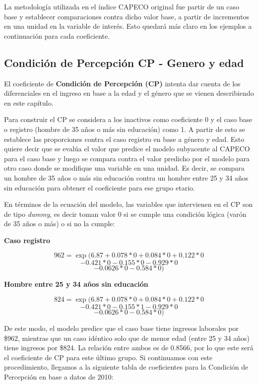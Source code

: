 La metodología utilizada en el índice CAPECO original fue partir de un caso base y establecer comparaciones contra dicho valor base, a partir de incrementos en una unidad en la variable de interés. Esto quedará más claro en los ejemplos a continuación para cada coeficiente.

\subsection{Condición de Percepción CP - Genero y edad}

El coeficiente de \textbf{Condición de Percepción (CP)} intenta dar cuenta de los diferenciales en el ingreso en base a la edad y el género que se vienen describiendo en este capítulo. 

Para construir el CP se considera a los inactivos como coeficiente 0 y el caso base o registro (hombre de 35 años o más sin educación) como 1. A partir de esto se establece las proporciones contra el caso registro en base a género y edad. Esto quiere decir que se evalúa el valor que predice el modelo subyacente al CAPECO para el caso base y luego se compara contra el valor predicho por el modelo para otro caso donde se modifique una variable en una unidad. Es decir, se compara un hombre de 35 años o más sin educación contra un hombre entre 25 y 34 años sin educación para obtener el coeficiente para ese grupo etario. 

En términos de la ecuación del modelo, las variables que intervienen en el CP son de tipo \textit{dummy}, es decir toman valor 0 si se cumple una condición lógica (varón de 35 años o más) o si no la cumple:


\textbf{Caso registro}

$$962 = \exp (6.87 + 0.078 * 0 + 0.084 * 0 + 0.122 * 0 $$
$$ - 0.421 * 0 - 0.155 * 0 - 0.929 * 0  $$
$$-0.0626 * 0 - 0.584 * 0) $$

\textbf{Hombre entre 25 y 34 años sin educación}

$$824 = \exp (6.87 + 0.078 * 0 + 0.084 * 0 + 0.122 * 0 $$
$$ - 0.421 * 0 - 0.155 * 1 - 0.929 * 0  $$
$$-0.0626 * 0 - 0.584 * 0) $$

De este modo, el modelo predice que el caso base tiene ingresos laborales por \$962, mientras que un caso idéntico solo que de menor edad (entre 25 y 34 años) tiene ingresos por \$824. La relación entre ambos es de 0.8566, por lo que este será el coeficiente de CP para este último grupo. 	Si continuamos con este procedimiento, llegamos a la siguiente tabla de coeficientes para la Condición de Percepción en base a datos de 2010:






